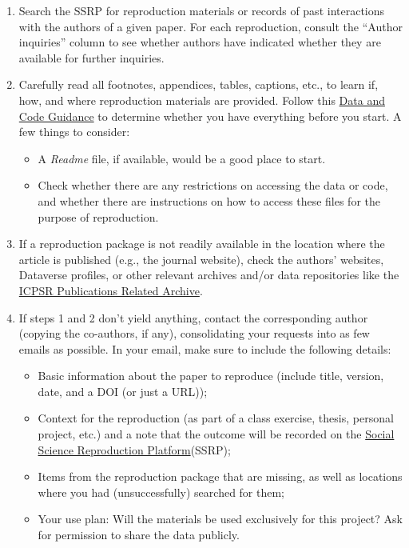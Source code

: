 \begin{enumerate}
    \item Search the SSRP for reproduction materials or records of past interactions with the authors of a given paper. For each reproduction, consult the “Author inquiries” column to see whether authors have indicated whether they are available for further inquiries.
    \item Carefully read all footnotes, appendices, tables, captions, etc., to learn if, how, and where reproduction materials are provided. Follow this \href{https://social-science-data-editors.github.io/guidance/Verification_guidance.html}{Data and Code Guidance} to determine whether you have everything before you start. A few things to consider:
    \begin{itemize}
        \item A \textit{Readme} file, if available, would be a good place to start.
        \item Check whether there are any restrictions on accessing the data or code, and whether there are instructions on how to access these files for the purpose of reproduction.
    \end{itemize}
    \item If a reproduction package is not readily available in the location where the article is published (e.g., the journal website), check the authors' websites, Dataverse profiles, or other relevant archives and/or data repositories like the \href{https://www.icpsr.umich.edu/icpsrweb/}{ICPSR Publications Related Archive}.
    \item If steps 1 and 2 don't yield anything, contact the corresponding author (copying the co-authors, if any), consolidating your requests into as few emails as possible. In your email, make sure to include the following details:
    \begin{itemize}
        \item Basic information about the paper to reproduce (include title, version, date, and a DOI (or just a URL));
        \item Context for the reproduction (as part of a class exercise, thesis, personal project, etc.) and a note that the outcome will be recorded on the \href{https://www.socialsciencereproduction.org/}{Social Science Reproduction Platform}(SSRP);
        \item Items from the reproduction package that are missing, as well as locations where you had (unsuccessfully) searched for them;
        \item Your use plan: Will the materials be used exclusively for this project? Ask for permission to share the data publicly.

\end{itemize}
\end{enumerate}
